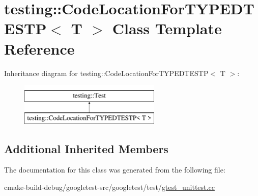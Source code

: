 \hypertarget{classtesting_1_1CodeLocationForTYPEDTESTP}{}\section{testing\+::Code\+Location\+For\+T\+Y\+P\+E\+D\+T\+E\+S\+TP$<$ T $>$ Class Template Reference}
\label{classtesting_1_1CodeLocationForTYPEDTESTP}
Inheritance diagram for testing\+::Code\+Location\+For\+T\+Y\+P\+E\+D\+T\+E\+S\+TP$<$ T $>$\+:\begin{figure}[H]
\begin{center}
\leavevmode
\includegraphics[height=2.000000cm]{classtesting_1_1CodeLocationForTYPEDTESTP}
\end{center}
\end{figure}
\subsection*{Additional Inherited Members}


The documentation for this class was generated from the following file\+:\begin{DoxyCompactItemize}
\item 
cmake-\/build-\/debug/googletest-\/src/googletest/test/\mbox{\hyperlink{gtest__unittest_8cc}{gtest\+\_\+unittest.\+cc}}\end{DoxyCompactItemize}

